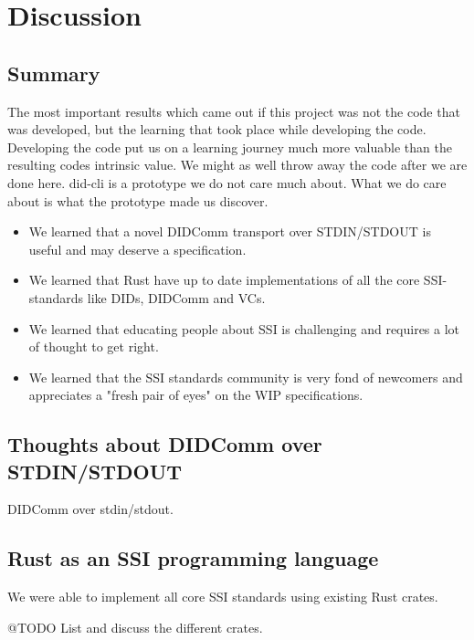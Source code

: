 \chapter{Discussion}

\section{Summary}

The most important results which came out if this project was not the code that was developed, but the learning that took place while developing the code. Developing the code put us on a learning journey much more valuable than the resulting codes intrinsic value. We might as well throw away the code after we are done here. \acrshort{did-cli} is a prototype we do not care much about. What we do care about is what the prototype made us discover.

\begin{itemize}
    \item We learned that a novel DIDComm transport over STDIN/STDOUT is useful and may deserve a specification.
    \item We learned that Rust have up to date implementations of all the core SSI-standards like DIDs, DIDComm and VCs.
    \item We learned that educating people about SSI is challenging and requires a lot of thought to get right.
    \item We learned that the SSI standards community is very fond of newcomers and appreciates a "fresh pair of eyes" on the WIP specifications.
\end{itemize}


\section{Thoughts about DIDComm over STDIN/STDOUT}

DIDComm over \acrshort{stdin}/\acrshort{stdout}.


\section{Rust as an SSI programming language}

We were able to implement all core SSI standards using existing Rust crates. 

@TODO List and discuss the different crates.


\section{}


